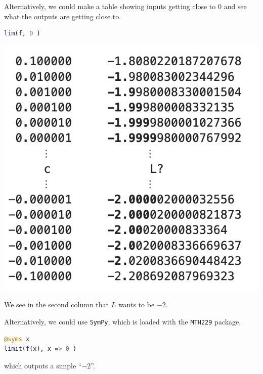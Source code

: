 \documentclass[12pt,answers]{book}
\begin{document}
Alternatively, we could make a table showing inputs getting close to 0 and see what the outputs are getting close to.\newline
\begin{minipage}{0.45\textwidth}
  \begin{lstlisting}[language=Julia]
    lim(f, 0 )
  \end{lstlisting}
\end{minipage}
\begin{minipage}{0.49\textwidth}
  \centering
  \includegraphics[width=0.6\linewidth]{SkeletonNotes/05-graphics-2}
\end{minipage}\newline
We see in the second column that $L$ wants to be $-2$.

Alternatively, we could use {\tt SymPy}, which is loaded with the {\tt MTH229} package.\newline
\begin{lstlisting}[language=Julia]
@syms x
limit(f(x), x => 0 )
\end{lstlisting}
which outputs a simple ``$-2$''.
\end{document}
